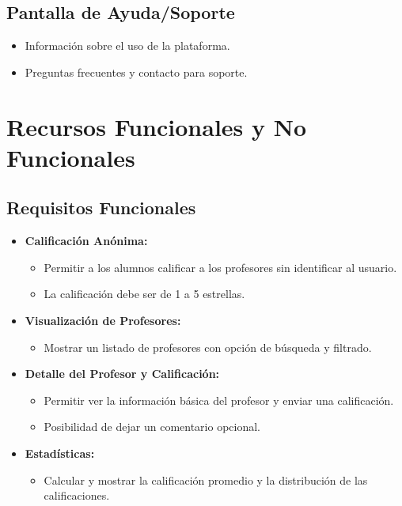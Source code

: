 \documentclass[11pt]{article}
\begin{document}
\subsection{Pantalla de Ayuda/Soporte}
\begin{itemize}
    \item Información sobre el uso de la plataforma.
    \item Preguntas frecuentes y contacto para soporte.
\end{itemize}

\newpage
\section{Recursos Funcionales y No Funcionales}

\subsection{Requisitos Funcionales}
\begin{itemize}
    \item \textbf{Calificación Anónima:}
    \begin{itemize}
        \item Permitir a los alumnos calificar a los profesores sin identificar al usuario.
        \item La calificación debe ser de 1 a 5 estrellas.
    \end{itemize}
    \item \textbf{Visualización de Profesores:}
    \begin{itemize}
        \item Mostrar un listado de profesores con opción de búsqueda y filtrado.
    \end{itemize}
    \item \textbf{Detalle del Profesor y Calificación:}
    \begin{itemize}
        \item Permitir ver la información básica del profesor y enviar una calificación.
        \item Posibilidad de dejar un comentario opcional.
    \end{itemize}
    \item \textbf{Estadísticas:}
    \begin{itemize}
        \item Calcular y mostrar la calificación promedio y la distribución de las calificaciones.
    \end{itemize}
\end{itemize}
\end{document}
